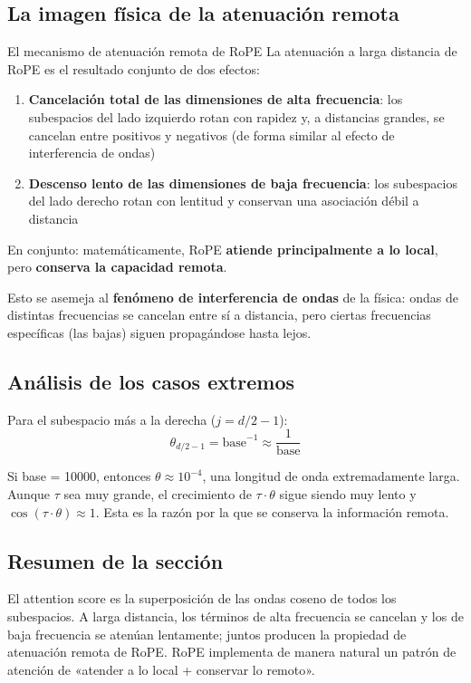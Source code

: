 \subsection{La imagen física de la atenuación remota}

\begin{importantbox}{El mecanismo de atenuación remota de RoPE}
La atenuación a larga distancia de RoPE es el resultado conjunto de dos efectos:
\begin{enumerate}
  \item \textbf{Cancelación total de las dimensiones de alta frecuencia}: los subespacios del lado izquierdo rotan con rapidez y, a distancias grandes, se cancelan entre positivos y negativos (de forma similar al efecto de interferencia de ondas)
  \item \textbf{Descenso lento de las dimensiones de baja frecuencia}: los subespacios del lado derecho rotan con lentitud y conservan una asociación débil a distancia
\end{enumerate}
En conjunto: matemáticamente, RoPE \textbf{atiende principalmente a lo local}, pero \textbf{conserva la capacidad remota}.
\end{importantbox}

Esto se asemeja al \textbf{fenómeno de interferencia de ondas} de la física: ondas de distintas frecuencias se cancelan entre sí a distancia, pero ciertas frecuencias específicas (las bajas) siguen propagándose hasta lejos.

\subsection{Análisis de los casos extremos}

Para el subespacio más a la derecha ($j = d/2 - 1$):
$$
\theta_{d/2-1} = \text{base}^{-1} \approx \frac{1}{\text{base}}
$$

Si base = 10000, entonces $\theta \approx 10^{-4}$, una longitud de onda extremadamente larga. Aunque $\tau$ sea muy grande, el crecimiento de $\tau \cdot \theta$ sigue siendo muy lento y $\cos(\tau \cdot \theta) \approx 1$. Esta es la razón por la que se conserva la información remota.

\subsection{Resumen de la sección}

El attention score es la superposición de las ondas coseno de todos los subespacios. A larga distancia, los términos de alta frecuencia se cancelan y los de baja frecuencia se atenúan lentamente; juntos producen la propiedad de atenuación remota de RoPE. RoPE implementa de manera natural un patrón de atención de «atender a lo local + conservar lo remoto».

